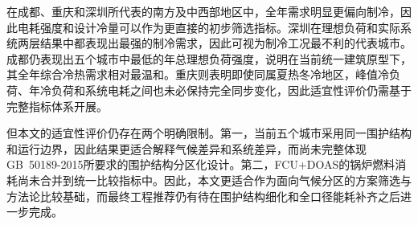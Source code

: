 在成都、重庆和深圳所代表的南方及中西部地区中，全年需求明显更偏向制冷，因此电耗强度和设计冷量可以作为更直接的初步筛选指标。深圳在理想负荷和实际系统两层结果中都表现出最强的制冷需求，因此可视为制冷工况最不利的代表城市。成都仍表现出五个城市中最低的年总理想负荷强度，说明在当前统一建筑原型下，其全年综合冷热需求相对最温和。重庆则表明即使同属夏热冬冷地区，峰值冷负荷、年冷负荷和系统电耗之间也未必保持完全同步变化，因此适宜性评价仍需基于完整指标体系开展。

但本文的适宜性评价仍存在两个明确限制。第一，当前五个城市采用同一围护结构和运行边界，因此结果更适合解释气候差异和系统差异，而尚未完整体现GB~50189-2015所要求的围护结构分区化设计。第二，FCU+DOAS的锅炉燃料消耗尚未合并到统一比较指标中。因此，本文更适合作为面向气候分区的方案筛选与方法论比较基础，而最终工程推荐仍有待在围护结构细化和全口径能耗补齐之后进一步完成。
